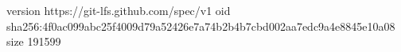 version https://git-lfs.github.com/spec/v1
oid sha256:4f0ac099abc25f4009d79a52426e7a74b2b4b7cbd002aa7edc9a4e8845e10a08
size 191599
